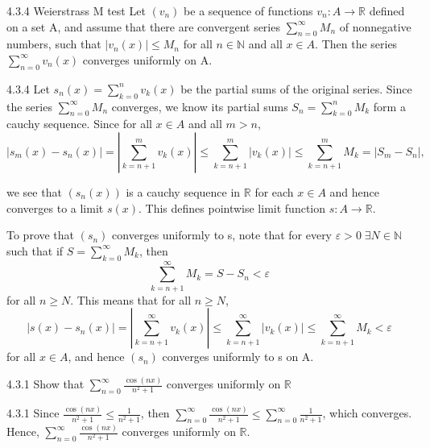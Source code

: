 \documentclass[a4paper,norsk]{article}
\renewcommand{\geq}{\geqslant}
\renewcommand{\leq}{\leqslant}
\renewcommand{\epsilon}{\varepsilon}
\begin{document}
\begin{propositionbox}{4.3.4 Weierstrass M test}{}
Let $ \left( v_n \right)  $ be a sequence of functions $ v_n : A \to \mathbb{R} $ defined on a set A, and assume that there are convergent series $ \sum_{n=0}^{\infty} M_n   $ of nonnegative numbers, such that $ \left| v_n(x) \right| \leq M_n $ for all $ n \in \mathbb{N} $ and all $ x \in A $. Then the series $ \sum_{n=0}^{\infty} v_n(x) $ converges uniformly on A.

\begin{proofbox}{4.3.4}{}
  Let $ s_n(x) = \sum_{k=0}^{n} v_k(x)  $ be the partial sums of the original series. Since the series $ \sum_{n=0}^{\infty} M_n $ converges, we know its partial sums $ S_n = \sum_{k=0}^{n} M_k  $ form a cauchy sequence. Since for all $ x \in A $ and all $ m > n $,
  \[
      \left| s_m(x) - s_n(x) \right| = \left| \sum_{k=n+1}^{m} v_k(x)  \right| \leq  \sum_{k=n+1}^{m} \left| v_k(x) \right| \leq  \sum_{k=n+1}^{m} M_k = \left| S_m - S_n \right|, 
  \]

  we see that $ \left( s_n(x) \right)  $ is a cauchy sequence in $ \mathbb{R} $ for each $ x \in A $ and hence converges to a limit $ s(x) $. This defines pointwise limit function $ s: A \to \mathbb{R} $.


  To prove that $ \left( s_n \right)  $ converges uniformly to s, note that for every $ \epsilon > 0 \; \exists N \in \mathbb{N} $ such that if $ S = \sum_{k=0}^{\infty} M_k   $, then
  \[
      \sum_{k=n+1}^{\infty} M_k = S - S_n < \epsilon       
  \]
  for all $ n \geq  N $. This means that for all $ n \geq N $,
  \[
      \left| s(x) - s_n(x) \right| = \left| \sum_{k=n+1}^{\infty} v_k(x)   \right| \leq  \sum_{k=n+1}^{\infty} \left| v_k(x) \right| \leq  \sum_{k=n+1}^{\infty} M_k < \epsilon   
  \]
  for all $ x \in A $, and hence $ \left( s_n \right)  $ converges uniformly to s on A. 
       
\end{proofbox}
\end{propositionbox}


\begin{oppgavebox}{4.3.1}{}
Show that $ \sum_{n=0}^{\infty} \frac{ \cos(nx)   }{ n^2+1 }   $  converges uniformly on $ \mathbb{R} $ 

\begin{proofbox}{4.3.1}{}
  Since $ \frac{ \cos(nx)   }{ n^2+1 } \leq  \frac{ 1 }{ n^2+1 } $, then $ \sum_{n=0}^{\infty} \frac{ \cos(nx)   }{ n^2 +1 } \leq  \sum_{n=0}^{\infty} \frac{ 1 }{ n^2+1 }    $, which converges. Hence, $ \sum_{n=0}^{\infty} \frac{ \cos(nx)   }{ n^2+1 }   $ converges uniformly on $ \mathbb{R} $.  
\end{proofbox}
\end{oppgavebox}
\end{document}
